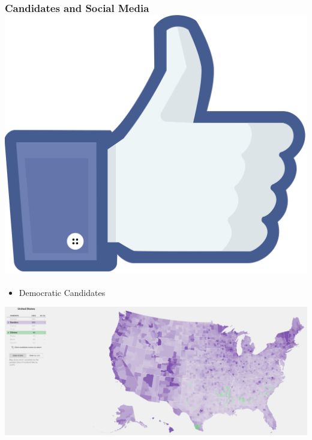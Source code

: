 \documentclass[xcolor=dvipsnames]{beamer}
\begin{document}
\begin{frame}
\frametitle{Candidates and Social Media  \hfill \includegraphics[scale=.015]{likes.png}}
\begin{itemize}
\item Democratic Candidates
\end{itemize}
\begin{center}

\includegraphics[scale=.14]{demmap.png}
\end{center}
\end{frame}
\end{document}
